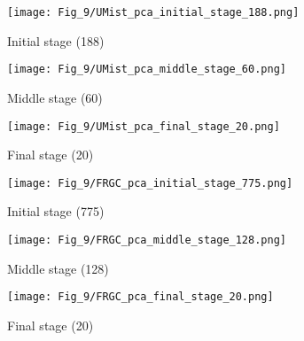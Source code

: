 \documentclass[10pt,twocolumn,letterpaper]{article}
\begin{document}
\begin{figure*}
   \begin{subfigure}{0.33\linewidth}
   \centering
    \texttt{[image: Fig\_9/UMist\_pca\_initial\_stage\_188.png]}
    \vspace{-5pt}
    \caption{Initial stage (188)}
          \vspace{20pt}
   \end{subfigure}
   \begin{subfigure}{0.33\linewidth}
   \centering
    \texttt{[image: Fig\_9/UMist\_pca\_middle\_stage\_60.png]}
    \vspace{-5pt}
    \caption{Middle stage (60)}
          \vspace{20pt}
   \end{subfigure}
   \begin{subfigure}{0.33\linewidth}
   \centering
       \texttt{[image: Fig\_9/UMist\_pca\_final\_stage\_20.png]}
   \vspace{-5pt}
   \caption{Final stage (20)}
         \vspace{20pt}
   \end{subfigure}

   \begin{subfigure}{0.33\linewidth}
   \centering
    \texttt{[image: Fig\_9/FRGC\_pca\_initial\_stage\_775.png]}
    \vspace{-5pt}
    \caption{Initial stage (775)}
          \vspace{20pt}
   \end{subfigure}
   \begin{subfigure}{0.33\linewidth}
   \centering
    \texttt{[image: Fig\_9/FRGC\_pca\_middle\_stage\_128.png]}
    \vspace{-5pt}
    \caption{Middle stage (128)}
          \vspace{20pt}
   \end{subfigure}
   \begin{subfigure}{0.33\linewidth}
   \centering
       \texttt{[image: Fig\_9/FRGC\_pca\_final\_stage\_20.png]}
   \vspace{-5pt}
   \caption{Final stage (20)}
         \vspace{20pt}
   \end{subfigure}


\end{figure*}
\end{document}
